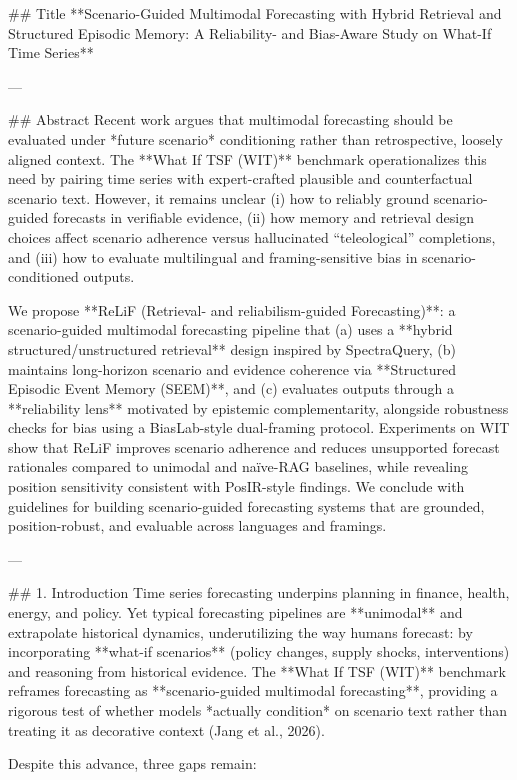 ## Title  
**Scenario-Guided Multimodal Forecasting with Hybrid Retrieval and Structured Episodic Memory: A Reliability- and Bias-Aware Study on What-If Time Series**

---

## Abstract  
Recent work argues that multimodal forecasting should be evaluated under *future scenario* conditioning rather than retrospective, loosely aligned context. The **What If TSF (WIT)** benchmark operationalizes this need by pairing time series with expert-crafted plausible and counterfactual scenario text. However, it remains unclear (i) how to reliably ground scenario-guided forecasts in verifiable evidence, (ii) how memory and retrieval design choices affect scenario adherence versus hallucinated “teleological” completions, and (iii) how to evaluate multilingual and framing-sensitive bias in scenario-conditioned outputs.  

We propose **ReLiF (Retrieval- and reliabilism-guided Forecasting)**: a scenario-guided multimodal forecasting pipeline that (a) uses a **hybrid structured/unstructured retrieval** design inspired by SpectraQuery, (b) maintains long-horizon scenario and evidence coherence via **Structured Episodic Event Memory (SEEM)**, and (c) evaluates outputs through a **reliability lens** motivated by epistemic complementarity, alongside robustness checks for bias using a BiasLab-style dual-framing protocol. Experiments on WIT show that ReLiF improves scenario adherence and reduces unsupported forecast rationales compared to unimodal and naïve-RAG baselines, while revealing position sensitivity consistent with PosIR-style findings. We conclude with guidelines for building scenario-guided forecasting systems that are grounded, position-robust, and evaluable across languages and framings.

---

## 1. Introduction  
Time series forecasting underpins planning in finance, health, energy, and policy. Yet typical forecasting pipelines are **unimodal** and extrapolate historical dynamics, underutilizing the way humans forecast: by incorporating **what-if scenarios** (policy changes, supply shocks, interventions) and reasoning from historical evidence. The **What If TSF (WIT)** benchmark reframes forecasting as **scenario-guided multimodal forecasting**, providing a rigorous test of whether models *actually condition* on scenario text rather than treating it as decorative context (Jang et al., 2026).  

Despite this advance, three gaps remain:

